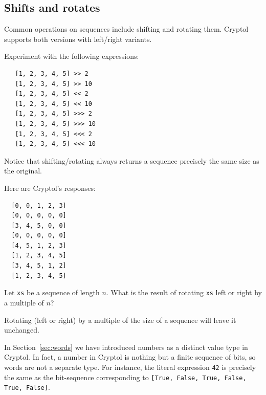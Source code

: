\subsection{Shifts and rotates} 
\label{sec:shifts-rotates}

Common operations on sequences include shifting and rotating them.
Cryptol supports both versions with left/right
variants.\indShiftLeft\indShiftRight\indRotLeft\indRotRight
\begin{Exercise}\label{ex:seq:14}
Experiment with the following expressions:
\begin{Verbatim}
   [1, 2, 3, 4, 5] >> 2
   [1, 2, 3, 4, 5] >> 10
   [1, 2, 3, 4, 5] << 2
   [1, 2, 3, 4, 5] << 10
   [1, 2, 3, 4, 5] >>> 2
   [1, 2, 3, 4, 5] >>> 10
   [1, 2, 3, 4, 5] <<< 2
   [1, 2, 3, 4, 5] <<< 10
\end{Verbatim}
\noindent Notice that shifting/rotating always returns a sequence
precisely the same size as the original.
\end{Exercise}
\begin{Answer}
Here are Cryptol's responses:
\begin{Verbatim}
  [0, 0, 1, 2, 3]
  [0, 0, 0, 0, 0]
  [3, 4, 5, 0, 0]
  [0, 0, 0, 0, 0]
  [4, 5, 1, 2, 3]
  [1, 2, 3, 4, 5]
  [3, 4, 5, 1, 2]
  [1, 2, 3, 4, 5]
\end{Verbatim}
\end{Answer}
\begin{Exercise}\label{ex:seq:15}
  Let {\tt xs} be a sequence of length $n$. What is the result of
  rotating {\tt xs} left or right by a multiple of $n$?
\end{Exercise}
\begin{Answer}
  Rotating (left or right) by a multiple of the size of a sequence
  will leave it unchanged.
\end{Answer}


In Section~\ref{sec:words} we have introduced numbers as a distinct
value type in Cryptol. In fact, a number in Cryptol is nothing but a
finite sequence of bits, so words are not a separate type. For
instance, the literal expression {\tt 42} is precisely the same as the
bit-sequence corresponding to {\tt [True, False, True, False, True,
  False]}.\indTheWordType


